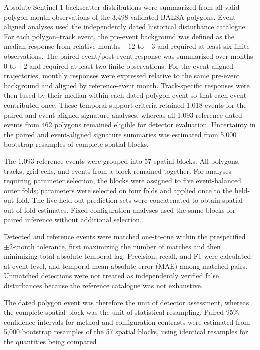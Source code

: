 Absolute Sentinel-1 backscatter distributions were summarized from all valid polygon-month observations of the 3,498 validated BALSA polygons. Event-aligned analyses used the independently dated historical disturbance catalogue. For each polygon--track event, the pre-event background was defined as the median response from relative months $-12$ to $-3$ and required at least six finite observations. The paired event/post-event response was summarized over months 0 to $+2$ and required at least two finite observations. For the event-aligned trajectories, monthly responses were expressed relative to the same pre-event background and aligned by reference-event month. Track-specific responses were then fused by their median within each dated polygon event so that each event contributed once. These temporal-support criteria retained 1,018 events for the paired and event-aligned signature analyses, whereas all 1,093 reference-dated events from 462 polygons remained eligible for detector evaluation. Uncertainty in the paired and event-aligned signature summaries was estimated from 5,000 bootstrap resamples of complete spatial blocks.


The 1,093 reference events were grouped into 57 spatial blocks. All polygons, tracks, grid cells, and events from a block remained together. For analyses requiring parameter selection, the blocks were assigned to five event-balanced outer folds; parameters were selected on four folds and applied once to the held-out fold. The five held-out prediction sets were concatenated to obtain spatial out-of-fold estimates. Fixed-configuration analyses used the same blocks for paired inference without additional selection.



Detected and reference events were matched one-to-one within the prespecified $\pm2$-month tolerance, first maximizing the number of matches and then minimizing total absolute temporal lag. Precision, recall, and F1 were calculated at event level, and temporal mean absolute error (MAE) among matched pairs. Unmatched detections were not treated as independently verified false disturbances because the reference catalogue was not exhaustive.


The dated polygon event was therefore the unit of detector assessment, whereas the complete spatial block was the unit of statistical resampling. Paired 95\% confidence intervals for method and configuration contrasts were estimated from 5,000 bootstrap resamples of the 57 spatial blocks, using identical resamples for the quantities being compared~\citep{Davison1997Bootstrap}.


